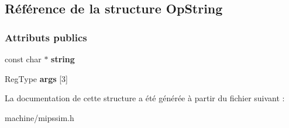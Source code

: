 \hypertarget{struct_op_string}{}\subsection{Référence de la structure Op\+String}
\label{struct_op_string}
\subsubsection*{Attributs publics}
\begin{DoxyCompactItemize}
\item 
\hypertarget{struct_op_string_a342f626cc6f66e8884c31fcf8c605bd4}{}\label{struct_op_string_a342f626cc6f66e8884c31fcf8c605bd4} 
const char $\ast$ {\bfseries string}
\item 
\hypertarget{struct_op_string_abcda212d60e80e7e6fc6ec2ca2e7ff94}{}\label{struct_op_string_abcda212d60e80e7e6fc6ec2ca2e7ff94} 
Reg\+Type {\bfseries args} \mbox{[}3\mbox{]}
\end{DoxyCompactItemize}


La documentation de cette structure a été générée à partir du fichier suivant \+:\begin{DoxyCompactItemize}
\item 
machine/mipssim.\+h\end{DoxyCompactItemize}
